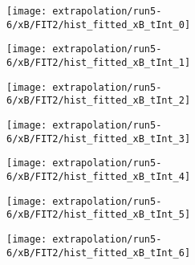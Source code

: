 \begin{figure}
\centering
\caption{Fit to the flask subtracted yield ratio with FIT2 for $x_B$ for run 5-6.}
\label{fig:run5-6_FIT2_xB}
\begin{subfigure}{0.45\linewidth}
\texttt{[image: extrapolation/run5-6/xB/FIT2/hist\_fitted\_xB\_tInt\_0]}
\end{subfigure}
\begin{subfigure}{0.45\linewidth}
\texttt{[image: extrapolation/run5-6/xB/FIT2/hist\_fitted\_xB\_tInt\_1]}
\end{subfigure}
\begin{subfigure}{0.45\linewidth}
\texttt{[image: extrapolation/run5-6/xB/FIT2/hist\_fitted\_xB\_tInt\_2]}
\end{subfigure}
\begin{subfigure}{0.45\linewidth}
\texttt{[image: extrapolation/run5-6/xB/FIT2/hist\_fitted\_xB\_tInt\_3]}
\end{subfigure}
\begin{subfigure}{0.45\linewidth}
\texttt{[image: extrapolation/run5-6/xB/FIT2/hist\_fitted\_xB\_tInt\_4]}
\end{subfigure}
\begin{subfigure}{0.45\linewidth}
\texttt{[image: extrapolation/run5-6/xB/FIT2/hist\_fitted\_xB\_tInt\_5]}
\end{subfigure}
\begin{subfigure}{0.45\linewidth}
\texttt{[image: extrapolation/run5-6/xB/FIT2/hist\_fitted\_xB\_tInt\_6]}
\end{subfigure}
\end{figure}
